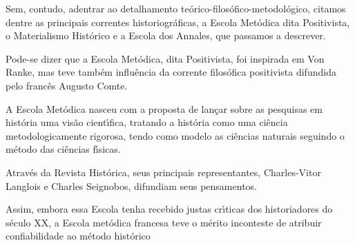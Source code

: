 \documentclass[
12pt,		%
openright,	%
twoside,  %
a4paper,			%
chapter=TITLE,		%
english,			%
french,				%
spanish,			%
brazil				%
]{USPSC-classe/USPSC_RedarTex}
\begin{document}
Sem, contudo, adentrar ao detalhamento te\'orico-filos\'ofico-metodol\'ogico, citamos dentre as principais correntes historiogr\'aficas, a Escola Met\'odica dita Positivista, o Materialismo Hist\'orico e a Escola dos Annales, que passamos a descrever.










Pode-se dizer que a Escola Met\'odica, dita Positivista, foi inspirada em Von Ranke, mas teve tamb\'em influ\^encia da corrente filos\'ofica positivista difundida pelo franc\^es Augusto Comte.










A Escola Met\'odica nasceu com a proposta de  lan\c{c}ar sobre as pesquisas em hist\'oria uma vis\~ao cient\'{\i}fica, tratando a hist\'oria como uma ci\^encia metodologicamente rigorosa, tendo como modelo as ci\^encias naturais seguindo o m\'etodo das ci\^encias f\'{\i}sicas.










Atrav\'es da Revista Hist\'orica, seus principais representantes, Charles-Vitor Langlois e Charles Seignobos, difundiam seus pensamentos.











\noindent\begin{center}\mbox{\centering{}}\end{center}


Assim, embora essa Escola tenha recebido justas cr\'{\i}ticas dos historiadores do s\'eculo XX, a Escola met\'odica francesa teve o m\'erito inconteste de atribuir confiabilidade ao m\'etodo hist\'orico
\end{document}
